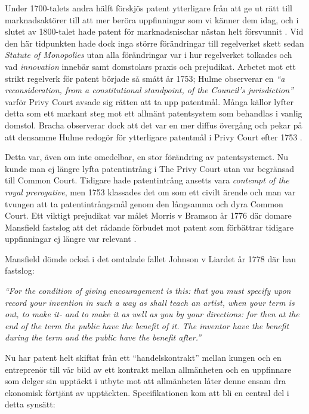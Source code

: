 Under 1700-talets andra hälft förskjös patent ytterligare från att ge ut rätt till marknadsaktörer till att mer beröra uppfinningar som vi känner dem idag, och i slutet av 1800-talet hade patent för marknadsnischar nästan helt försvunnit \cite{bracha}. 
Vid den här tidpunkten hade dock inga större förändringar till regelverket skett sedan \emph{Statute of Monopolies}
utan alla förändringar var i hur regelverket tolkades och vad \emph{innovation} innebär samt domstolars praxis och prejudikat. Arbetet mot ett strikt regelverk för patent började så smått år 1753; Hulme \cite{hulme3} observerar en \emph{``a reconsideration, from a constitutional standpoint, of the Council’s jurisdiction''} varför Privy Court avsade sig rätten att ta upp patentmål. Många källor lyfter detta som ett markant steg mot ett allmänt patentsystem som behandlas i vanlig domstol. Bracha observerar dock att det var en mer diffus övergång och pekar på att densamme Hulme redogör för ytterligare patentmål i Privy Court efter 1753 \cite{bracha}.

Detta var, även om inte omedelbar, en stor förändring av patentsystemet. Nu kunde man ej längre lyfta patentintrång i The Privy Court utan var begränsad till Common Court. Tidigare hade patentintrång ansetts vara \emph{contempt of the royal prerogative}, men 1753 klassades det om som ett civilt ärende och man var tvungen att ta patentintrångsmål genom den långsamma och dyra Common Court. Ett viktigt prejudikat var målet Morris v Bramson år 1776 där domare Mansfield fastslog att det rådande förbudet mot patent som förbättrar tidigare uppfinningar ej längre var relevant \cite{bracha}.

Mansfield dömde också i det omtalade fallet Johnson v Liardet år 1778 där han fastslog:

\emph{``For the condition of giving encouragement is this: that 
you must specify upon record your invention in such a 
way as shall teach an artist, when your term is out, to 
make it- and to make it as well as you by your directions: 
for then at the end of the term the public have the benefit 
of it. The inventor have the benefit during the term and 
the public have the benefit after.''} \cite{hulme1}

Nu har patent helt skiftat från ett ``handelskontrakt'' mellan kungen och en entreprenör till vår bild av ett kontrakt mellan allmänheten och en uppfinnare som delger sin upptäckt i utbyte mot att allmänheten låter denne ensam dra ekonomisk förtjänt av upptäckten. Specifikationen kom att bli en central del i detta synsätt: 

